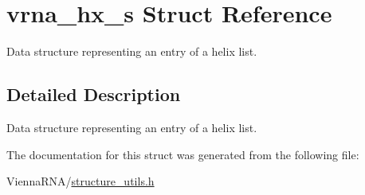 \hypertarget{structvrna__hx__s}{}\section{vrna\+\_\+hx\+\_\+s Struct Reference}
\label{structvrna__hx__s}


Data structure representing an entry of a helix list.  




\subsection{Detailed Description}
Data structure representing an entry of a helix list. 

The documentation for this struct was generated from the following file\+:\begin{DoxyCompactItemize}
\item 
Vienna\+R\+N\+A/\mbox{\hyperlink{structure__utils_8h}{structure\+\_\+utils.\+h}}\end{DoxyCompactItemize}
